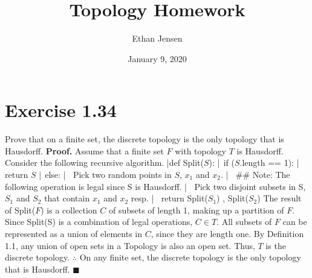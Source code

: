 \documentclass[12pt]{article}
\title{Topology Homework}
\author{Ethan Jensen}
\date{January 9, 2020}
\begin{document}
	\maketitle
  \section[20pt]{Exercise 1.34}
	Prove that on a finite set, the discrete topology is the only topology that is Hausdorff.
	\newline \newline
	\textbf{Proof. } Assume that a finite set \(F\) with topology \(T\) is Hausdorff. \newline
	Consider the following recursive algorithm. \newline \newline
	|def Split(\(S\)): \newline
	|\(\ \ \)if (\(S\).length == 1): \newline
	|\(\ \ \ \ \)return \(S\) \newline
	|\(\ \ \)else: \newline
	|\(\ \ \ \ \)Pick two random points in \(S\), \(x_1\) and \(x_2\). \newline
	|\(\ \ \ \ \)## Note: The following operation is legal since S is Hausdorff. \newline
	|\(\ \ \ \ \)Pick two disjoint subsets in S, \(S_1\) and \(S_2\) that contain \(x_1\) and \(x_2\) resp. \newline
	|\(\ \ \ \ \)return Split(\(S_1\)) , Split(\(S_2\)) \newline \newline
	The result of Split(\(F\)) is a collection \(C\) of subsets of length 1, making up a partition of \(F\). \newline
	Since Split(S) is a combination of legal operations, \(C \in T\). \newline
	All subsets of \(F\) can be represented as a union of elements in \(C\), since they are length one. \newline
	By Definition 1.1, any union of open sets in a Topology is also an open set. \newline
	Thus, \(T\) is the discrete topology. \newline
	\(\therefore\) On any finite set, the discrete topology is the only topology that is Hausdorff. \newline
	\(\blacksquare\)
\end{document}
